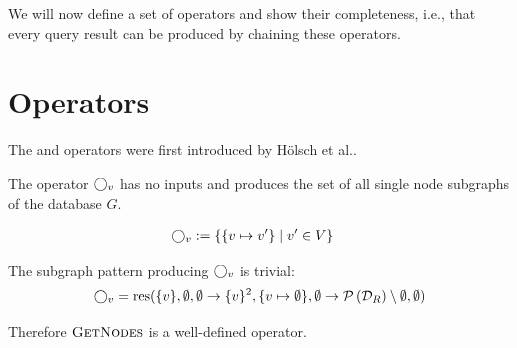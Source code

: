 We will now define a set of operators and show their completeness, i.e., that every
query result can be produced by chaining these operators.

\section{Operators}
\label{sec:operators}

The  and  operators were first introduced by
Hölsch et al.\cite{holsch_algebra_2016}.

\begin{definition}
\label{def:get-nodes}
The  operator $\bigcirc_{v}$ has no inputs and produces the set of
all single node subgraphs of the database $G$.

\begin{align*}
  \bigcirc_{v} &:= \{ \{ v \mapsto v' \} \mid v' \in V \}
\end{align*}

The subgraph pattern producing $\bigcirc_{v}$ is trivial:
\[
  \bigcirc_{v} = \text{res}(
                   \{ v \},
                   \emptyset,
                   \emptyset \rightarrow \{v\}^2,
                   \{ v \mapsto \emptyset \},
                   \emptyset \rightarrow \mathcal{P}\left(\mathcal{D}_R\right) \setminus \emptyset,
                   \emptyset)
\]

Therefore $\textsc{GetNodes}$ is a well-defined operator.
\end{definition}


